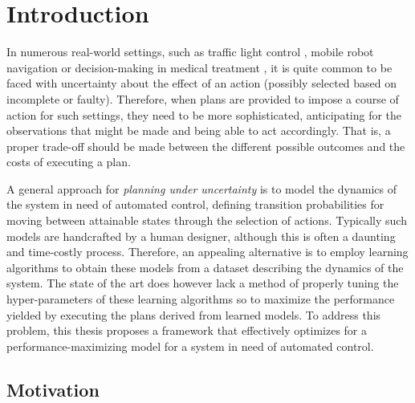 \chapter{Introduction}
\label{ch:introduction}

In numerous real-world settings, such as traffic light control \cite{wiering2004intelligent}, mobile robot navigation \cite{MartinezCantin2009} or decision-making in medical treatment \cite{schaefer2005modeling}, it is quite common to be faced with uncertainty about the effect of an action (possibly selected based on incomplete or faulty).
Therefore, when plans are provided to impose a course of action for such settings, they need to be more sophisticated, anticipating for the observations that might be made and being able to act accordingly.
That is, a proper trade-off should be made between the different possible outcomes and the costs of executing a plan.

A general approach for \textit{planning under uncertainty} is to model the dynamics of the system in need of automated control, defining transition probabilities for moving between attainable states through the selection of actions.
Typically such models are handcrafted by a human designer, although this is often a daunting and time-costly process.
Therefore, an appealing alternative is to employ learning algorithms to obtain these models from a dataset describing the dynamics of the system.
The state of the art does however lack a method of properly tuning the hyper-parameters of these learning algorithms so to maximize the performance yielded by executing the plans derived from learned models.
To address this problem, this thesis proposes a framework that effectively optimizes for a performance-maximizing model for a system in need of automated control.

\section{Motivation}
\label{sec:motivation}

